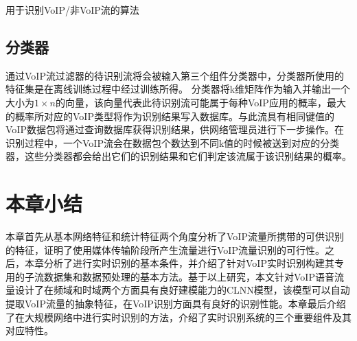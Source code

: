 

\begin{algorithm}[htp]
\caption{用于识别VoIP/非VoIP流的算法}
\label{algorithm:filter}
\end{algorithm}

\subsection{分类器}
通过VoIP流过滤器的待识别流将会被输入第三个组件分类器中，分类器所使用的特征集是在离线训练过程中经过训练所得。
分类器将k维矩阵作为输入并输出一个大小为$1 \times n$的向量，该向量代表此待识别流可能属于每种VoIP应用的概率，最大的概率所对应的VoIP类型将作为识别结果写入数据库。与此流具有相同键值的VoIP数据包将通过查询数据库获得识别结果，供网络管理员进行下一步操作。在识别过程中，一个VoIP流会在数据包个数达到不同k值的时候被送到对应的分类器，这些分类器都会给出它们的识别结果和它们判定该流属于该识别结果的概率。

\section{本章小结}
本章首先从基本网络特征和统计特征两个角度分析了VoIP流量所携带的可供识别的特征，证明了使用媒体传输阶段所产生流量进行VoIP流量识别的可行性。之后，本章分析了进行实时识别的基本条件，并介绍了针对VoIP实时识别构建其专用的子流数据集和数据预处理的基本方法。基于以上研究，本文针对VoIP语音流量设计了在频域和时域两个方面具有良好建模能力的CLNN模型，该模型可以自动提取VoIP流量的抽象特征，在VoIP识别方面具有良好的识别性能。本章最后介绍了在大规模网络中进行实时识别的方法，介绍了实时识别系统的三个重要组件及其对应特性。















